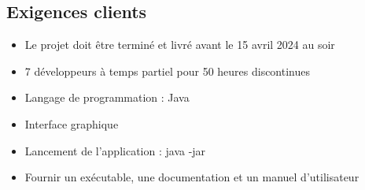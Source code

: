 \subsection{Exigences clients}
\begin{itemize}
    \item Le projet doit être terminé et livré avant le 15 avril 2024 au soir
    \item 7 développeurs à temps partiel pour 50 heures discontinues
    \item Langage de programmation : Java
    \item Interface graphique
    \item Lancement de l'application : java -jar \executable
    \item Fournir un exécutable, une documentation et un manuel d'utilisateur
\end{itemize}